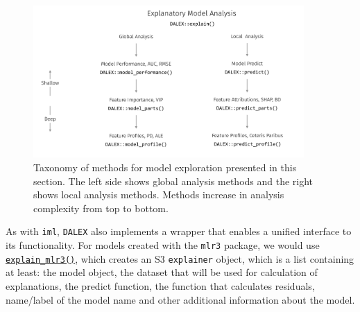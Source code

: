 \begin{figure}

{\centering \includegraphics[width=0.92\textwidth,height=\textheight]{chapters/chapter12/Figures/DALEX_ema_process.pdf}

}

\caption{\label{fig-dalex-fig-plot-01}Taxonomy of methods for model
exploration presented in this section. The left side shows global
analysis methods and the right shows local analysis methods. Methods
increase in analysis complexity from top to bottom.}

\end{figure}

As with \texttt{iml}, \texttt{DALEX} also implements a wrapper that
enables a unified interface to its functionality. For models created
with the \texttt{mlr3} package, we would use
\href{https://www.rdocumentation.org/packages/DALEXtra/topics/explain_mlr3}{\texttt{explain\_mlr3()}},
which creates an S3 \texttt{explainer} object, which is a list
containing at least: the model object, the dataset that will be used for
calculation of explanations, the predict function, the function that
calculates residuals, name/label of the model name and other additional
information about the model.

\begin{Shaded}
\begin{Highlighting}[]

\OtherTok{=}\SpecialCharTok{::}
   \SpecialCharTok{$}\SpecialCharTok{==} \NormalTok{),}
   \NormalTok{,}
   \NormalTok{)}

\end{Highlighting}
\end{Shaded}

